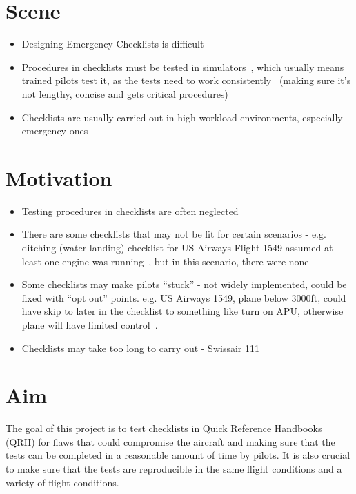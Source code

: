 \documentclass[../dissertation.tex]{subfiles}
\begin{document}
\section{Scene}
\begin{itemize}
    \item Designing Emergency Checklists is difficult
    \item Procedures in checklists must be tested in simulators~\cite{nasa:design},
      which usually means trained pilots test it, as the tests need
      to work consistently~\cite{manifesto} (making sure it's not lengthy,
      concise and gets critical procedures)
    \item Checklists are usually carried out in high
        workload environments, especially emergency ones
\end{itemize}

\section{Motivation}
\begin{itemize}
  \item Testing procedures in checklists are often neglected~\cite{nasa:design}
    \item There are some checklists that may not be fit
        for certain scenarios - e.g. ditching (water landing)
        checklist for US Airways Flight 1549 assumed at least one engine
        was running~\cite{ntsb:AWE1549}, but in this scenario, there were none
    \item Some checklists may make pilots \enquote{stuck}
      - not widely implemented, could be fixed with \enquote{opt out} points.
      e.g. US Airways 1549, plane below 3000ft, could have skip to
      later in the checklist to something like turn on APU, otherwise plane
      will have limited control~\cite{ntsb:AWE1549}.
    \item Checklists may take too long to carry out - Swissair 111
\end{itemize}

\section{Aim}
The goal of this project is to test checklists in Quick Reference Handbooks (QRH)
for flaws that could compromise the aircraft and making sure that the tests can
be completed in a reasonable amount of time by pilots. It is also crucial to make
sure that the tests are reproducible in the same flight conditions and a variety of
flight conditions.
\end{document}
